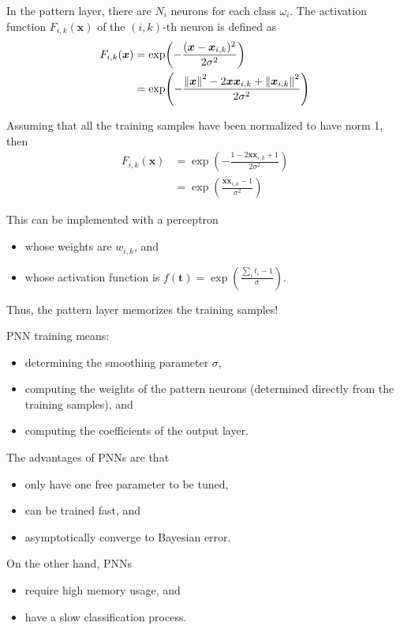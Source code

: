 \documentclass[oneside,onecolumn]{report}
\begin{document}
In the pattern layer, there are $N_i$ neurons for each class $\omega_i$.
The activation function $F_{i,k}(\bm x)$ of the $(i, k)$-th neuron is defined as
\begin{align*}
    F_{i,k}(\bm x)
    &= \exp(-\frac{(\bm x - \bm x_{i,k})^2}{2 \sigma^2}) \\
    &= \exp(-\frac{\norm{\bm x}^2 - 2 \bm x \bm x_{i,k} + \norm{\bm x_{i,k}}^2}{2 \sigma^2})
\end{align*}

Assuming that all the training samples have been normalized to have norm 1, then
\begin{align*}
F_{i,k}(\bm x)
    &= \exp(-\frac{1 - 2 \bm x \bm x_{i,k} + 1}{2 \sigma^2}) \\
    &= \exp(\frac{\bm x \bm x_{i,k} - 1}{ \sigma^2})
\end{align*}

This can be implemented with a perceptron
\begin{itemize}
    \item whose weights are $w_{i,k}$, and
    \item whose activation function is $f(\bm t) = \exp(\frac{\sum_i t_i - 1}{\sigma})$.
\end{itemize}

Thus, the pattern layer memorizes the training samples!

PNN training means:
\begin{itemize}
    \item determining the smoothing parameter $\sigma$,
    \item computing the weights of the pattern neurons (determined directly from the training samples), and
    \item computing the coefficients of the output layer.
\end{itemize}

The advantages of PNNs are that
\begin{itemize}
    \item only have one free parameter to be tuned,
    \item can be trained fast, and
    \item asymptotically converge to Bayesian error.
\end{itemize}

On the other hand, PNNs
\begin{itemize}
    \item require high memory usage, and
    \item have a slow classification process.
\end{itemize}
\end{document}
